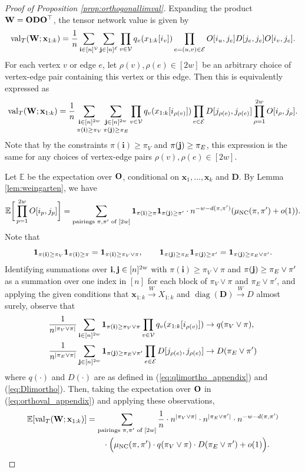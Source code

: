 \documentclass[10pt,reqno]{amsart}
\def\x{\mathbf{x}}
\def\W{\mathbf{W}}
\def\D{\mathbf{D}}
\def\E{\mathbb{E}}
\def\cV{\mathcal{V}}
\def\cE{\mathcal{E}}
\def\diag{\operatorname{diag}}
\def\val{\operatorname{val}}
\def\toW{\overset{W}{\to}}
\def\1{\mathbf{1}}
\def\bi{\mathbf{i}}
\begin{document}
\begin{proof}[Proof of Proposition \ref{prop:orthogonallimval}]

Expanding the product $\W=\Ob\Db\Ob^\top$,
the tensor network value is given by
\[\val_T(\W;\x_{1:k})=\frac{1}{n}\sum_{\bi \in [n]^{\cV}}
\sum_{\bj \in [n]^{\cE}} \prod_{v \in \cV} q_v(x_{1:k}[i_v])
\prod_{e=(u,v) \in \cE} O[i_u,j_e]D[j_e,j_e]O[i_v,j_e].\]
For each vertex $v$ or edge $e$, let $\rho(v),\rho(e) \in [2w]$ be an arbitrary
choice of vertex-edge pair containing this vertex or this edge. 
Then this is equivalently expressed as
\begin{equation}\label{eq:orthoval_appendix}
\val_T(\W;\x_{1:k})=\frac{1}{n}
\mathop{\sum_{\bi \in [n]^{2w}}}_{\pi(\bi) \geq \pi_V}
\mathop{\sum_{\bj \in [n]^{2w}}}_{\pi(\bj) \geq \pi_E}
\prod_{v \in \cV} q_v(x_{1:k}[i_{\rho(v)}])
\prod_{e \in \cE} D[j_{\rho(e)},j_{\rho(e)}] \prod_{\rho=1}^{2w} 
O[i_\rho,j_\rho].
\end{equation}
Note that by the constraints $\pi(\bi) \geq \pi_V$ and $\pi(\mathbf{j}) \geq \pi_E$,
this expression is the same for any choices of vertex-edge pairs
$\rho(v),\rho(e) \in [2w]$. 

Let $\E$ be the expectation over $\mathbf{O}$, conditional on $\x_1,\ldots,\x_k$ and
$\D$. By Lemma \ref{lem:weingarten}, we have
\[\E\bigg[\prod_{p=1}^{2w} O[i_p,j_p]\bigg]
=\sum_{\text{pairings } \pi,\pi' \text{ of } [2w]}
\1_{\pi(\bi) \geq \pi}\1_{\pi(\bj) \geq \pi'} \cdot
n^{-w-d(\pi,\pi')}(\Moeb(\pi,\pi')+o(1)).\]
Note that
\[\1_{\pi(\bi) \geq \pi_V}\1_{\pi(\bi) \geq \pi}=\1_{\pi(\bi) \geq
\pi_V \vee \pi}, \qquad
\1_{\pi(\bj) \geq \pi_E}\1_{\pi(\bj) \geq \pi'}=\1_{\pi(\bj) \geq
\pi_E \vee \pi'}.\]
Identifying summations over
$\bi,\bj \in [n]^{2w}$ with $\pi(\bi) \geq \pi_V \vee \pi$
and $\pi(\mathbf{j}) \geq \pi_E \vee \pi'$ as a summation over one index in $[n]$ for
each block of $\pi_V \vee \pi$ and $\pi_E \vee \pi'$, and applying the
given conditions that $\x_{1:k} \toW X_{1:k}$ and $\diag(\D) \toW D$ almost
surely, observe that
\begin{align*}
\frac{1}{n^{|\pi_V \vee \pi|}}\sum_{\bi \in [n]^{2w}}
\1_{\pi(\bi) \geq \pi_V \vee \pi} \prod_{v \in \cV} q_v(x_{1:k}[i_{\rho(v)}])
&\to q(\pi_V \vee \pi),\\
\frac{1}{n^{|\pi_E \vee \pi|}}\sum_{\bj \in [n]^{2w}}
\1_{\pi(\bj) \geq \pi_E \vee \pi'} \prod_{e \in \cE} D[j_{\rho(e)},j_{\rho(e)}]
&\to D(\pi_E \vee \pi')
\end{align*}
where $q(\cdot)$ and $D(\cdot)$ are as defined in
(\ref{eq:qlimortho_appendix}) and (\ref{eq:Dlimortho}).
Then, taking the expectation over $\mathbf{O}$ in (\ref{eq:orthoval_appendix})
and applying these observations,
\begin{align}
\E[\val_T(\W;\x_{1:k})]
&=\sum_{\text{pairings } \pi,\pi' \text{ of } [2w]}
\frac{1}{n} \cdot n^{|\pi_V \vee \pi|} \cdot n^{|\pi_E \vee \pi'|}
\cdot n^{-w-d(\pi,\pi')}\notag\\
&\qquad \cdot \Big(\Moeb(\pi,\pi') \cdot q(\pi_V \vee \pi) \cdot
D(\pi_E \vee \pi')+o(1)\Big).\label{eq:finalorthoval}
\end{align}


\end{proof}
\end{document}

